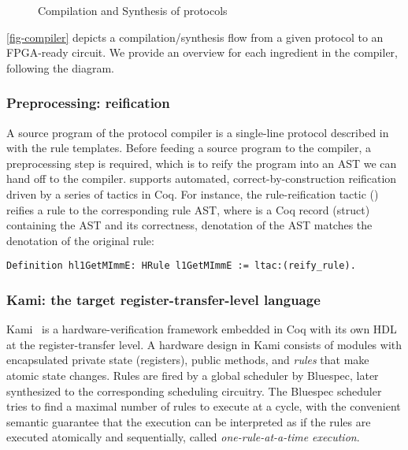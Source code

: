 \begin{figure}[t]
  \caption{Compilation and Synthesis of \hemiola{} protocols}
  \label{fig-compiler}
\end{figure}

\autoref{fig-compiler} depicts a compilation/synthesis flow from a given \hemiola{} protocol to an FPGA-ready circuit.
We provide an overview for each ingredient in the compiler, following the diagram.

\subsubsection{Preprocessing: reification}

A source program of the protocol compiler is a single-line protocol described in \hemiola{} with the rule templates.
Before feeding a \hemiola{} source program to the compiler, a preprocessing step is required, which is to reify the program into an AST we can hand off to the compiler.
\hemiola{} supports automated, correct-by-construction reification driven by a series of tactics in Coq.
For instance, the rule-reification tactic () reifies a \hemiola{} rule to the corresponding rule AST, where  is a Coq record (struct) containing the AST and its correctness, \ie{} denotation of the AST matches the denotation of the original rule:
\begin{lstlisting}[numbers=none, frame=none]
    Definition hl1GetMImmE: HRule l1GetMImmE := ltac:(reify_rule).
\end{lstlisting}

\subsubsection{Kami: the target register-transfer-level language}

Kami~\cite{kami} is a hardware-verification framework embedded in Coq with its own HDL at the register-transfer level.
A hardware design in Kami consists of modules with encapsulated private state (registers), public methods, and \emph{rules} that make atomic state changes.
Rules are fired by a global scheduler by Bluespec, later synthesized to the corresponding scheduling circuitry.
The Bluespec scheduler tries to find a maximal number of rules to execute at a cycle, with the convenient semantic guarantee that the execution can be interpreted as if the rules are executed atomically and sequentially, called \emph{one-rule-at-a-time execution}.

